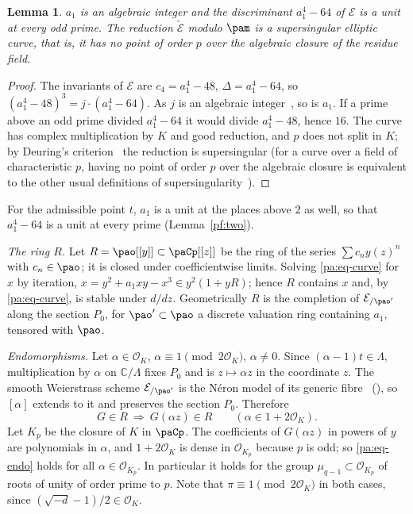 \documentclass[10pt]{amsart}
\newtheorem{lemma}[theorem]{Lemma}
\theoremstyle{definition}
\theoremstyle{remark}
\newcommand{\C}{\mathbb C}
\providecommand{\auO}{\mathcal O}
\begin{document}
\begin{lemma}\label{pa:model}
$a_1$ is an algebraic integer and the discriminant $a_1^4-64$ of $\mathcal E$ is a unit at every
odd prime. The reduction $\widetilde{\mathcal E}$ modulo $\pam$ is a supersingular elliptic curve,
that is, it has no point of order $p$ over the algebraic closure of the residue field.
\end{lemma}
\begin{proof}
The invariants of $\mathcal E$ are $c_4=a_1^4-48$, $\Delta=a_1^4-64$, so
$(a_1^4-48)^3=j\cdot(a_1^4-64)$. As $j$ is an algebraic integer~\cite[Chapter~II, Theorem~6.1]{SilvermanAT},
so is $a_1$. If a prime above an odd prime divided $a_1^4-64$ it would divide $a_1^4-48$, hence
$16$. The curve has complex multiplication by $K$ and good reduction, and $p$ does not split in
$K$; by Deuring's criterion~\cite[Chapter~13, Theorem~12]{LangEF} the reduction is supersingular (for a curve over a field
of characteristic $p$, having no point of order $p$ over the algebraic closure is equivalent to
the other usual definitions of supersingularity~\cite[Chapter~V, Theorem~3.1(a)]{SilvermanAEC}).
\end{proof}
For the admissible point $t$, $a_1$ is a unit at the places above $2$ as well, so that $a_1^4-64$
is a unit at every prime (Lemma~\ref{pf:two}).

\emph{The ring $R$.} Let $R=\pao[[y]]\subset\paCp[[z]]$ be the ring of the series $\sum c_ny(z)^n$
with $c_n\in\pao$; it is closed under coefficientwise limits. Solving \eqref{pa:eq-curve} for $x$
by iteration, $x=y^2+a_1xy-x^3\in y^2(1+yR)$; hence $R$ contains $x$ and, by
\eqref{pa:eq-curve}, is stable under $d/dz$. Geometrically $R$ is the completion of
$\mathcal E_{/\pao'}$ along the section $P_0$, for $\pao'\subset\pao$ a discrete valuation ring
containing $a_1$, tensored with $\pao$.

\emph{Endomorphisms.} Let $\alpha\in\auO_K$, $\alpha\equiv1\pmod{2\auO_K}$, $\alpha\ne0$. Since
$(\alpha-1)t\in\Lambda$, multiplication by $\alpha$ on $\C/\Lambda$ fixes $P_0$ and is $z\mapsto
\alpha z$ in the coordinate $z$. The smooth Weierstrass scheme $\mathcal E_{/\pao'}$ is the N\'eron
model of its generic fibre~\cite[\S1.2, Definition~1, p.~12, and Proposition~8, p.~15]{BLR} (\cite[IV, Corollary~6.3, p.~329, and the N\'eron mapping property, p.~319]{SilvermanAT}), so $[\alpha]$ extends to it and preserves the
section $P_0$. Therefore
\begin{equation}\label{pa:eq-endo}
G\in R\ \Longrightarrow\ G(\alpha z)\in R\qquad(\alpha\in1+2\auO_K).
\end{equation}
Let $K_p$ be the closure of $K$ in $\paCp$. The coefficients of $G(\alpha z)$ in powers of $y$ are
polynomials in $\alpha$, and $1+2\auO_K$ is dense in $\auO_{K_p}$ because $p$ is odd; so
\eqref{pa:eq-endo} holds for all $\alpha\in\auO_{K_p}$. In particular it holds for the group
$\mu_{q-1}\subset\auO_{K_p}$ of roots of unity of order prime to $p$. Note that $\pi\equiv1
\pmod{2\auO_K}$ in both cases, since $(\sqrt{-d}-1)/2\in\auO_K$.
\end{document}

